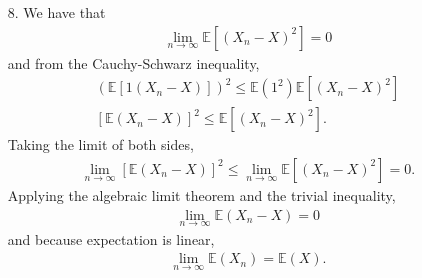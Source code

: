 \documentclass[a4paper,12pt]{article}
\begin{document}
\begin{enumerate}
    \item[8.]
        We have that
        \begin{align*}
            \lim_{n \to \infty} \mathbb{E} \left[ (X_n - X)^2 \right] = 0
        \end{align*}
        and from the Cauchy-Schwarz inequality,
        \begin{gather*}
            \left( \mathbb{E} \left[ 1(X_n - X) \right] \right)^2 \leq \mathbb{E}(1^2) \mathbb{E} \left[ (X_n - X)^2 \right] \\
            [\mathbb{E}(X_n - X)]^2 \leq \mathbb{E} \left[ (X_n - X)^2 \right].
        \end{gather*}
        Taking the limit of both sides,
        \begin{align*}
            \lim_{n \to \infty} [\mathbb{E}(X_n - X)]^2 \leq \lim_{n \to \infty} \mathbb{E} \left[ (X_n - X)^2 \right] = 0.
        \end{align*}
        Applying the algebraic limit theorem and the trivial inequality,
        \begin{align*}
            \lim_{n \to \infty} \mathbb{E}(X_n - X) = 0
        \end{align*}
        and because expectation is linear,
        \begin{align*}
            \lim_{n \to \infty} \mathbb{E}(X_n) = \mathbb{E}(X).
        \end{align*}

        \iffalse
        \begin{align*}
            [\mathbb{E} (X_n X)]^2 \leq \mathbb{E} \left( X_n^2 \right) \mathbb{E} \left( X^2 \right).
        \end{align*}
        Because expectation is linear,
        \begin{align*}
            \mathbb{E} \left[ (X_n - X)^2 \right] &= \mathbb{E} \left( X_n^2 \right) - 2\mathbb{E}(X_n X) + \mathbb{E} \left( X^2 \right) \\
            &\geq \mathbb{E} \left( X_n^2 \right) - 2\sqrt{\mathbb{E}(X_n^2) \mathbb{E}(X^2)} + \mathbb{E} \left( X^2 \right) \\
            &= \left( \sqrt{\mathbb{E}(X_n^2)} - \sqrt{\mathbb{E}(X^2)} \right)^2
        \end{align*}
        and taking the limit of both sides,
        \begin{align*}
            \lim_{n \to \infty} \mathbb{E} \left[ (X_n - X)^2 \right] = 0 \geq \lim_{n \to \infty} \left( \sqrt{\mathbb{E}(X_n^2)} - \sqrt{\mathbb{E}(X^2)} \right)^2.
        \end{align*}
        Applying the composition rule for limits and the trivial inequality,
        \begin{gather*}
            \lim_{n \to \infty} \left( \sqrt{\mathbb{E}(X_n^2)} - \sqrt{\mathbb{E}(X^2)} \right) = 0 \\
            \lim_{n \to \infty} \sqrt{\mathbb{E}(X_n^2)} = \sqrt{\mathbb{E}(X^2)} \\
            \lim_{n \to \infty} \mathbb{E} \left( X_n^2 \right) = \mathbb{E} \left( X^2 \right).
        \end{gather*}
        \fi


\end{enumerate}
\end{document}
